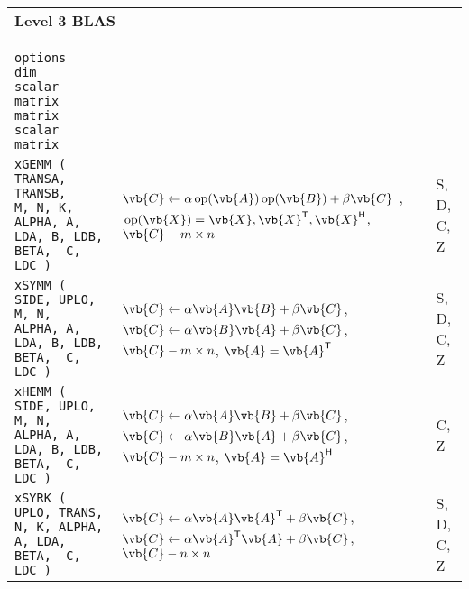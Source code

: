 \documentclass[10pt,a3paper, landscape]{article}
\newcommand{\T}{\mathsf{T}}
\renewcommand{\H}{\mathsf{H}}
\renewcommand{\op}{\,\mathrm{op}}
\begin{document}
\begin{tabular}{lll}
		\multicolumn{3}{l}{\Large{\textbf{Level 3 BLAS}}}                                                                                                                                                                                                                                                                                                                                                                                                       \\
		\verb|        options                          dim      scalar matrix  matrix  scalar matrix   |                                                                    &                                                                                                                                                                                                                                                              &                    \\
		\verb|xGEMM (             TRANSA, TRANSB,      M, N, K, ALPHA, A, LDA, B, LDB, BETA,  C, LDC ) |                                                                    & $\vb{C} \gets \alpha \op(\vb{A})\op(\vb{B})                             + \beta \vb{C} $                                                                    , $\op(\vb{X}) = \vb{X}, \vb{X}^{\T}, \vb{X}^{\H}$, $\vb{C} - m \times n$                        & S, D, C, Z         \\
		\verb|xSYMM ( SIDE, UPLO,                      M, N,    ALPHA, A, LDA, B, LDB, BETA,  C, LDC ) |                                                                    & $\vb{C} \gets \alpha \vb{A}    \vb{B}                                 + \beta \vb{C} $, $\vb{C} \gets \alpha  \vb{B}   \vb{A}                                 + \beta \vb{C} $,                        $\vb{C} - m \times n$, $\vb{A}=\vb{A}^{\T}$           & S, D, C, Z         \\
		\verb|xHEMM ( SIDE, UPLO,                      M, N,    ALPHA, A, LDA, B, LDB, BETA,  C, LDC ) |                                                                    & $\vb{C} \gets \alpha \vb{A}    \vb{B}                                 + \beta \vb{C} $, $\vb{C} \gets \alpha  \vb{B}   \vb{A}                                 + \beta \vb{C} $,                        $\vb{C} - m \times n$, $\vb{A}=\vb{A}^{\H}$           & C, Z               \\
		\verb|xSYRK (       UPLO, TRANS,                  N, K, ALPHA, A, LDA,         BETA,  C, LDC ) |                                                                    & $\vb{C} \gets \alpha \vb{A}    \vb{A}^{\T}                               + \beta \vb{C} $, $\vb{C} \gets \alpha  \vb{A}^{\T} \vb{A}                                 + \beta \vb{C} $,                        $\vb{C} - n \times n$                           & S, D, C, Z         \\

\end{tabular}
\end{document}
